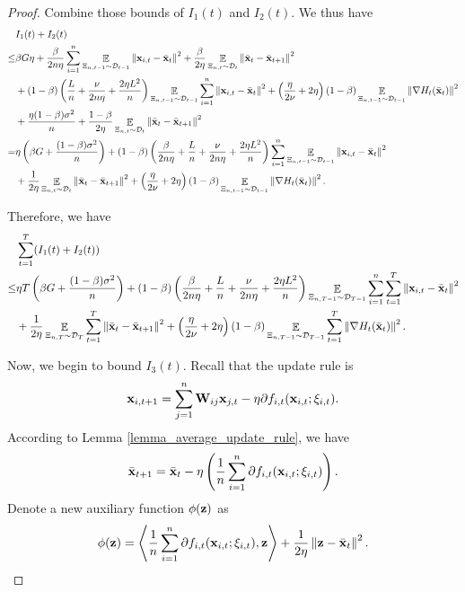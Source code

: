 \documentclass{article}
\begin{document}
\begin{proof}
Combine those bounds of $I_1(t)$ and $I_2(t)$. We thus have
\begin{align}
\nonumber
& I_1(t) + I_2(t) \\ \nonumber 
\le & \beta G \eta + \frac{\beta}{2n\eta }\sum_{i=1}^n \mathop{\mathbb{E}}_{ \Xi_{n,t-1} \sim \mathcal{D}_{t-1} }\left\lVert{\bf x}_{i,t} - \bar{{\bf x}}_t\right\rVert^2 + \frac{\beta }{2\eta } \mathop{\mathbb{E}}_{ \Xi_{n,t} \sim \mathcal{D}_{t} }\left\lVert\bar{{\bf x}}_t - \bar{{\bf x}}_{t+1}\right\rVert^2 \\ \nonumber
& + (1-\beta)\left(  \frac{L}{n} + \frac{\nu}{2n\eta} + \frac{2\eta L^2}{n}  \right)\mathop{\mathbb{E}}_{ \Xi_{n,t-1} \sim \mathcal{D}_{t-1} }\sum_{i=1}^n\left\lVert{\bf x}_{i,t} - \bar{{\bf x}}_t \right\rVert^2   + \left(  \frac{\eta}{2\nu} + 2\eta  \right)(1-\beta)\mathop{\mathbb{E}}_{ \Xi_{n,t-1} \sim \mathcal{D}_{t-1} }\left\lVert\nabla H_t(\bar{{\bf x}}_t)\right\rVert^2 \\ \nonumber 
&+ \frac{\eta (1-\beta)\sigma^2}{n} +  \frac{1-\beta}{2\eta} \mathop{\mathbb{E}}_{ \Xi_{n,t} \sim \mathcal{D}_{t} }\left\lVert \bar{{\bf x}}_t - \bar{{\bf x}}_{t+1}\right\rVert^2 \\ \nonumber
= & \eta\left(  \beta G + \frac{(1-\beta)\sigma^2}{n} \right) + (1-\beta)\left( \frac{\beta}{2n\eta } +\frac{L}{n} + \frac{\nu}{2n\eta} + \frac{2\eta L^2}{n}  \right)\sum_{i=1}^n \mathop{\mathbb{E}}_{ \Xi_{n,t-1} \sim \mathcal{D}_{t-1} }\left\lVert{\bf x}_{i,t} - \bar{{\bf x}}_t\right\rVert^2 \\ \nonumber
& + \frac{1}{2\eta } \mathop{\mathbb{E}}_{ \Xi_{n,t} \sim \mathcal{D}_{t} }\left\lVert\bar{{\bf x}}_t - \bar{{\bf x}}_{t+1}\right\rVert^2  + \left(  \frac{\eta}{2\nu} + 2\eta  \right)(1-\beta)\mathop{\mathbb{E}}_{ \Xi_{n,t-1} \sim \mathcal{D}_{t-1} }\left\lVert\nabla H_t(\bar{{\bf x}}_t)\right\rVert^2. 
\end{align}

Therefore, we have 
\begin{align}
\nonumber
&\sum_{t=1}^T (I_1(t) + I_2(t)) \\ \nonumber
\le & \eta T \left(  \beta G + \frac{(1-\beta)\sigma^2}{n} \right) + (1-\beta)\left( \frac{\beta}{2n\eta } +\frac{L}{n} + \frac{\nu}{2n\eta} + \frac{2\eta L^2}{n}  \right) \mathop{\mathbb{E}}_{ \Xi_{n,T-1} \sim \mathcal{D}_{T-1} }\sum_{i=1}^n \sum_{t=1}^T \left\lVert{\bf x}_{i,t} - \bar{{\bf x}}_t\right\rVert^2  \\ \nonumber
& + \frac{1}{2\eta } \mathop{\mathbb{E}}_{ \Xi_{n,T} \sim \mathcal{D}_{T} }\sum_{t=1}^T \left\lVert\bar{{\bf x}}_t - \bar{{\bf x}}_{t+1}\right\rVert^2 + \left(  \frac{\eta}{2\nu} + 2\eta  \right)(1-\beta)\mathop{\mathbb{E}}_{ \Xi_{n,T-1} \sim \mathcal{D}_{T-1} }\sum_{t=1}^T\left\lVert\nabla H_t(\bar{{\bf x}}_t)\right\rVert^2.
\end{align} 




Now, we begin to bound $I_3(t)$. Recall that the update rule is 
\begin{align}
\nonumber
{\bf x}_{i,t+1} = \sum_{j=1}^n {\bf W}_{ij}{\bf x}_{j,t} - \eta \partial f_{i,t}({\bf x}_{i,t};\xi_{i,t}).
\end{align}  According to Lemma \ref{lemma_average_update_rule}, we have 
\begin{align}
\label{equa_thoerem_update_rule_equivalent}
\bar{{\bf x}}_{t+1} = \bar{{\bf x}}_t - \eta \left( \frac{1}{n}\sum_{i=1}^n \partial f_{i,t}({\bf x}_{i,t};\xi_{i,t}) \right).
\end{align} 
Denote a new auxiliary function $\phi({\bf z})$ as 
\begin{align}
\nonumber
\phi({\bf z}) = \left\langle\frac{1}{n}\sum_{i=1}^n \partial f_{i,t}({\bf x}_{i,t};\xi_{i,t}), {\bf z} \right\rangle + \frac{1}{2\eta}\left\lVert{\bf z} - \bar{{\bf x}}_t\right\rVert^2.
\end{align} 


\end{proof}
\end{document}
